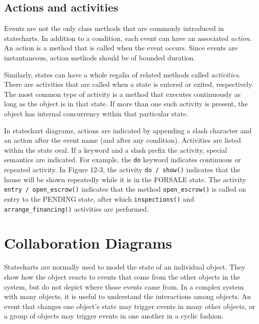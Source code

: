 \subsection{Actions and activities}

Events are not the only class methods that are commonly introduced in
statecharts. In addition to a condition, each event can have an
associated \textit{action}. An action is a
method that is called when the event occurs. Since events are
instantaneous, action methods should be of bounded duration.

Similarly, states can have a whole regalia of related methods called
\textit{activities}. There are activities
that are called when a state is entered or exited, respectively. The
most common type of activity is a method that executes continuously as
long as the object is in that state. If more than one such activity is
present, the object has internal concurrency within that particular
state.

In statechart diagrams, actions are indicated by appending a slash
character and an action after the event name (and after any
condition). Activities are listed within the state
oval. If a keyword and a slash prefix the activity, special semantics
are indicated. For example, the \texttt{do} keyword indicates
continuous or repeated activity. In Figure 12-3, the activity
\texttt{do / show()} indicates that the house will be shown repeatedly
while it is in the FORSALE state. The activity \texttt{entry /
open\_escrow()} indicates that the method \texttt{open\_escrow()} is
called on entry to the PENDING state, after which
\texttt{inspections()} and \texttt{arrange\_financing()} activities are
performed.

\section{Collaboration Diagrams}

Statecharts are normally used to model the state of an individual
object. They show how the object reacts to events that come from the
other objects in the system, but do not depict where those events came
from. In a complex system with many objects, it is useful to understand
the interactions among objects. An event that changes one
object's state may trigger events in many other
objects, or a group of objects may trigger events in one another in a
cyclic fashion.


